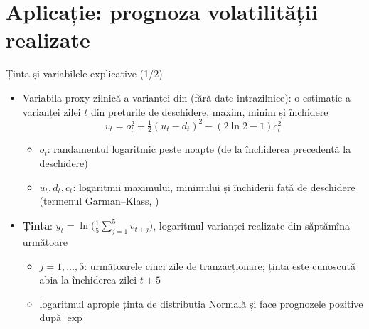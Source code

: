 \section{Aplicație: prognoza volatilității realizate}

\begin{frame}{Ținta și variabilele explicative (1/2)}
\itemsize{\small}
\begin{itemize}
    \item Variabila proxy zilnică a varianței din  (fără date intrazilnice): o estimație a varianței zilei $t$ din prețurile de deschidere, maxim, minim și închidere \[ v_t = o_t^2 + \tfrac12(u_t - d_t)^2 - (2\ln 2 - 1)c_t^2 \]
    \begin{itemize}
        \item $o_t$: randamentul logaritmic peste noapte (de la închiderea precedentă la deschidere)
        \item $u_t, d_t, c_t$: logaritmii maximului, minimului și închiderii față de deschidere (termenul Garman--Klass, )
    \end{itemize}
    \item \textbf{Ținta}: $y_t = \ln\big(\tfrac15\sum_{j=1}^{5} v_{t+j}\big)$, logaritmul varianței realizate din săptămîna următoare
    \begin{itemize}
        \item $j = 1, \dots, 5$: următoarele cinci zile de tranzacționare; ținta este cunoscută abia la închiderea zilei $t + 5$
        \item logaritmul apropie ținta de distribuția Normală și face prognozele pozitive după $\exp$
    \end{itemize}
\end{itemize}
\end{frame}

